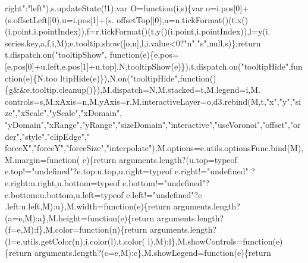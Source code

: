 \begin{DoxyCode}
{{{{      right"}:\textcolor{stringliteral}{"left"}),s.updateState(!1);var O=\textcolor{keyword}{function}(i,s)\{var o=i.pos[0]+(s.offsetLeft||0),u=i.pos[1]+(s.
      offsetTop||0),a=n.tickFormat()(t.x()(i.point,i.pointIndex)),f=r.tickFormat()(t.y()(i.point,i.pointIndex)),l=y(i.
      series.key,a,f,i,M);e.tooltip.show([o,u],l,i.value<0?\textcolor{stringliteral}{"n"}:\textcolor{stringliteral}{"s"},null,s)\};\textcolor{keywordflow}{return} t.dispatch.on(\textcolor{stringliteral}{"tooltipShow"},\textcolor{keyword}{
      function}(e)\{e.pos=[e.pos[0]+u.left,e.pos[1]+u.top],N.tooltipShow(e)\}),t.dispatch.on(\textcolor{stringliteral}{"tooltipHide"},\textcolor{keyword}{function}(e)\{N.too
      ltipHide(e)\}),N.on(\textcolor{stringliteral}{"tooltipHide"},\textcolor{keyword}{function}()\{g&&e.tooltip.cleanup()\}),M.dispatch=N,M.stacked=t,M.legend=i,M.
      controls=s,M.xAxis=n,M.yAxis=r,M.interactiveLayer=o,d3.rebind(M,t,\textcolor{stringliteral}{"x"},\textcolor{stringliteral}{"y"},\textcolor{stringliteral}{"size"},\textcolor{stringliteral}{"xScale"},\textcolor{stringliteral}{"yScale"},\textcolor{stringliteral}{"xDomain"},\textcolor{stringliteral}{
      "yDomain"},\textcolor{stringliteral}{"xRange"},\textcolor{stringliteral}{"yRange"},\textcolor{stringliteral}{"sizeDomain"},\textcolor{stringliteral}{"interactive"},\textcolor{stringliteral}{"useVoronoi"},\textcolor{stringliteral}{"offset"},\textcolor{stringliteral}{"order"},\textcolor{stringliteral}{"style"},\textcolor{stringliteral}{"clipEdge"},\textcolor{stringliteral}{"
      forceX"},\textcolor{stringliteral}{"forceY"},\textcolor{stringliteral}{"forceSize"},\textcolor{stringliteral}{"interpolate"}),M.options=e.utils.optionsFunc.bind(M),M.margin=\textcolor{keyword}{function}(
      e)\{\textcolor{keywordflow}{return} arguments.length?(u.top=typeof e.top!=\textcolor{stringliteral}{"undefined"}?e.top:u.top,u.right=typeof e.right!=\textcolor{stringliteral}{"undefined"}
      ?e.right:u.right,u.bottom=typeof e.bottom!=\textcolor{stringliteral}{"undefined"}?e.bottom:u.bottom,u.left=typeof e.left!=\textcolor{stringliteral}{"undefined"}?e
      .left:u.left,M):u\},M.width=\textcolor{keyword}{function}(e)\{\textcolor{keywordflow}{return} arguments.length?(a=e,M):a\},M.height=\textcolor{keyword}{function}(e)\{\textcolor{keywordflow}{return} 
      arguments.length?(f=e,M):f\},M.color=\textcolor{keyword}{function}(n)\{\textcolor{keywordflow}{return} arguments.length?(l=e.utils.getColor(n),i.color(l),t.color(
      l),M):l\},M.showControls=\textcolor{keyword}{function}(e)\{\textcolor{keywordflow}{return} arguments.length?(c=e,M):c\},M.showLegend=\textcolor{keyword}{function}(e)\{\textcolor{keywordflow}{return} 
}}}
\end{DoxyCode}
